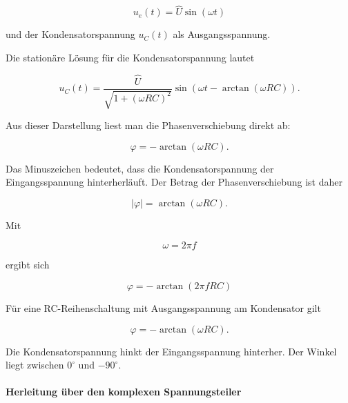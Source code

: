 \begin{equation}
	u_e(t)=\hat{U}\sin(\omega t)
	\label{eq:rc-phasenverschiebung-eingangsspannung}
\end{equation}

und der Kondensatorspannung \(u_C(t)\) als Ausgangsspannung.

Die stationäre Lösung für die Kondensatorspannung lautet

\begin{equation}
	u_C(t)
	=
	\frac{\hat{U}}{\sqrt{1+(\omega RC)^2}}
	\sin\left(
	\omega t
	-
	\arctan(\omega RC)
	\right).
	\label{eq:rc-stationaere-loesung-fuer-phase}
\end{equation}

Aus dieser Darstellung liest man die Phasenverschiebung direkt ab:

\begin{equation}
	\varphi
	=
	-\arctan(\omega RC).
	\label{eq:rc-phasenverschiebung-kondensator}
\end{equation}

Das Minuszeichen bedeutet, dass die Kondensatorspannung der Eingangsspannung
hinterherläuft. Der Betrag der Phasenverschiebung ist daher

\begin{equation}
	|\varphi|
	=
	\arctan(\omega RC).
	\label{eq:rc-betrag-phasenverschiebung-kondensator}
\end{equation}

Mit

\begin{equation}
	\omega = 2\pi f
	\label{eq:rc-phase-kreisfrequenz}
\end{equation}

ergibt sich

\begin{equation}
	\boxed{
		\varphi
		=
		-\arctan(2\pi f RC)
	}
	\label{eq:rc-phasenverschiebung-frequenz}
\end{equation}

\begin{MathBox}
	\label{box:rc-phasenverschiebung-tiefpass}
	Für eine RC-Reihenschaltung mit Ausgangsspannung am Kondensator gilt
	
	\[
	\varphi
	=
	-\arctan(\omega RC).
	\]
	
	Die Kondensatorspannung hinkt der Eingangsspannung hinterher. Der Winkel liegt
	zwischen \(0^\circ\) und \(-90^\circ\).
\end{MathBox}

\paragraph{Herleitung über den komplexen Spannungsteiler}

